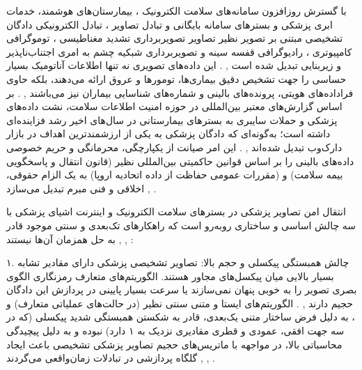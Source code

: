 با گسترش روزافزون سامانه‌های سلامت الکترونیک ، بیمارستان‌های هوشمند، خدمات ابری پزشکی و بسترهای سامانه بایگانی و تبادل تصاویر ، تبادل الکترونیکی دادگان تشخیصی مبتنی بر تصویر نظیر تصاویر تصویربرداری تشدید مغناطیسی ، توموگرافی کامپیوتری ، رادیوگرافی قفسه سینه  و تصویربرداری شبکیه چشم به امری اجتناب‌ناپذیر و زیربنایی تبدیل شده است , . این داده‌های تصویری نه تنها اطلاعات آناتومیک بسیار حساسی را جهت تشخیص دقیق بیماری‌ها، تومورها و عروق ارائه می‌دهند، بلکه حاوی فراداده‌های هویتی، پرونده‌های بالینی و شماره‌های شناسایی بیماران نیز می‌باشند , . بر اساس گزارش‌های معتبر بین‌المللی در حوزه امنیت اطلاعات سلامت، نشت داده‌های پزشکی و حملات سایبری به بسترهای بیمارستانی در سال‌های اخیر رشد فزاینده‌ای داشته است؛ به‌گونه‌ای که دادگان پزشکی به یکی از ارزشمندترین اهداف در بازار دارک‌وب تبدیل شده‌اند , . این امر صیانت از یکپارچگی، محرمانگی و حریم خصوصی داده‌های بالینی را بر اساس قوانین حاکمیتی بین‌المللی نظیر  (قانون انتقال و پاسخگویی بیمه سلامت) و  (مقررات عمومی حفاظت از داده اتحادیه اروپا) به یک الزام حقوقی، اخلاقی و فنی مبرم تبدیل می‌سازد , .\par



انتقال امن تصاویر پزشکی در بسترهای سلامت الکترونیک و اینترنت اشیای پزشکی  با سه چالش اساسی و ساختاری روبه‌رو است که راهکارهای تک‌بعدی و سنتی موجود قادر به حل همزمان آن‌ها نیستند , , :\par



۱. چالش همبستگی پیکسلی و حجم بالا: تصاویر تشخیصی پزشکی دارای مقادیر تشابه بسیار بالایی میان پیکسل‌های مجاور هستند. الگوریتم‌های متعارف رمزنگاری الگوی بصری تصویر را به خوبی پنهان نمی‌سازند یا سرعت بسیار پایینی در پردازش این دادگان حجیم دارند , . الگوریتم‌های ایستا و متنی سنتی نظیر  (در حالت‌های عملیاتی متعارف) و ، به دلیل فرض ساختار متنی یک‌بعدی، قادر به شکستن همبستگی شدید پیکسلی (که در سه جهت افقی، عمودی و قطری مقادیری نزدیک به ۱ دارد) نبوده و به دلیل پیچیدگی محاسباتی بالا، در مواجهه با ماتریس‌های حجیم تصاویر پزشکی تشخیصی باعث ایجاد گلگاه  پردازشی در تبادلات زمان‌واقعی  می‌گردند , , .\par

